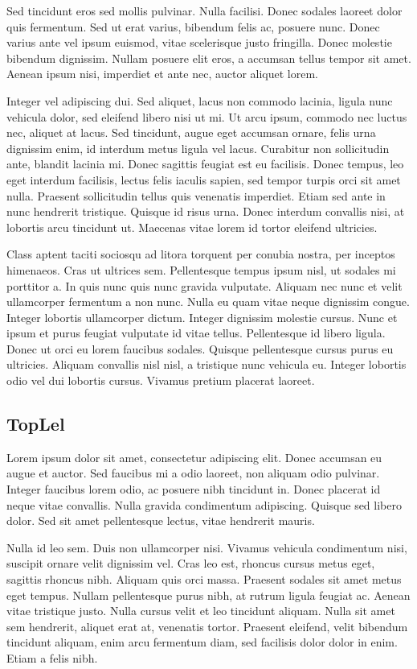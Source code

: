 \documentclass{elec6049report}     %
\begin{document}
Sed tincidunt eros sed mollis pulvinar. Nulla facilisi. Donec sodales laoreet dolor quis fermentum. Sed ut erat varius, bibendum felis ac, posuere nunc. Donec varius ante vel ipsum euismod, vitae scelerisque justo fringilla. Donec molestie bibendum dignissim. Nullam posuere elit eros, a accumsan tellus tempor sit amet. Aenean ipsum nisi, imperdiet et ante nec, auctor aliquet lorem.

Integer vel adipiscing dui. Sed aliquet, lacus non commodo lacinia, ligula nunc vehicula dolor, sed eleifend libero nisi ut mi. Ut arcu ipsum, commodo nec luctus nec, aliquet at lacus. Sed tincidunt, augue eget accumsan ornare, felis urna dignissim enim, id interdum metus ligula vel lacus. Curabitur non sollicitudin ante, blandit lacinia mi. Donec sagittis feugiat est eu facilisis. Donec tempus, leo eget interdum facilisis, lectus felis iaculis sapien, sed tempor turpis orci sit amet nulla. Praesent sollicitudin tellus quis venenatis imperdiet. Etiam sed ante in nunc hendrerit tristique. Quisque id risus urna. Donec interdum convallis nisi, at lobortis arcu tincidunt ut. Maecenas vitae lorem id tortor eleifend ultricies.

Class aptent taciti sociosqu ad litora torquent per conubia nostra, per inceptos himenaeos. Cras ut ultrices sem. Pellentesque tempus ipsum nisl, ut sodales mi porttitor a. In quis nunc quis nunc gravida vulputate. Aliquam nec nunc et velit ullamcorper fermentum a non nunc. Nulla eu quam vitae neque dignissim congue. Integer lobortis ullamcorper dictum. Integer dignissim molestie cursus. Nunc et ipsum et purus feugiat vulputate id vitae tellus. Pellentesque id libero ligula. Donec ut orci eu lorem faucibus sodales. Quisque pellentesque cursus purus eu ultricies. Aliquam convallis nisl nisl, a tristique nunc vehicula eu. Integer lobortis odio vel dui lobortis cursus. Vivamus pretium placerat laoreet.
\subsection{TopLel}
Lorem ipsum dolor sit amet, consectetur adipiscing elit. Donec accumsan eu augue et auctor. Sed faucibus mi a odio laoreet, non aliquam odio pulvinar. Integer faucibus lorem odio, ac posuere nibh tincidunt in. Donec placerat id neque vitae convallis. Nulla gravida condimentum adipiscing. Quisque sed libero dolor. Sed sit amet pellentesque lectus, vitae hendrerit mauris.

Nulla id leo sem. Duis non ullamcorper nisi. Vivamus vehicula condimentum nisi, suscipit ornare velit dignissim vel. Cras leo est, rhoncus cursus metus eget, sagittis rhoncus nibh. Aliquam quis orci massa. Praesent sodales sit amet metus eget tempus. Nullam pellentesque purus nibh, at rutrum ligula feugiat ac. Aenean vitae tristique justo. Nulla cursus velit et leo tincidunt aliquam. Nulla sit amet sem hendrerit, aliquet erat at, venenatis tortor. Praesent eleifend, velit bibendum tincidunt aliquam, enim arcu fermentum diam, sed facilisis dolor dolor in enim. Etiam a felis nibh.
\end{document}
